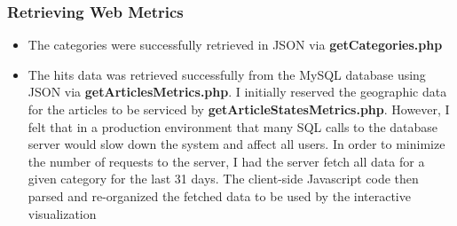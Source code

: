 \documentclass[12pt]{article}
\begin{document}
\subsubsection{Retrieving Web Metrics}
\begin{itemize}
\item The categories were successfully retrieved in JSON via \textbf{getCategories.php}
\item The hits data was retrieved successfully from the MySQL database using JSON via \textbf{getArticlesMetrics.php}. I initially reserved the geographic data for the articles to be serviced by \textbf{getArticleStatesMetrics.php}. However, I felt that in a production environment that many SQL calls to the database server would slow down the system and affect all users. In order to minimize the number of requests to the server, I had the server fetch all data for a given category for the last 31 days. The client-side Javascript code then parsed and re-organized the fetched data to be used by the interactive visualization
\end{itemize}
\end{document}
